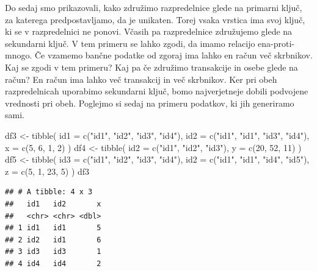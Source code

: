 \documentclass[
]{book}
\newenvironment{Shaded}{\begin{snugshade}}{\end{snugshade}}
\newcommand{\AttributeTok}[1]{\textcolor[rgb]{0.77,0.63,0.00}{#1}}
\newcommand{\DecValTok}[1]{\textcolor[rgb]{0.00,0.00,0.81}{#1}}
\newcommand{\FunctionTok}[1]{\textcolor[rgb]{0.00,0.00,0.00}{#1}}
\newcommand{\NormalTok}[1]{#1}
\newcommand{\OtherTok}[1]{\textcolor[rgb]{0.56,0.35,0.01}{#1}}
\newcommand{\StringTok}[1]{\textcolor[rgb]{0.31,0.60,0.02}{#1}}
\begin{document}
Do sedaj smo prikazovali, kako združimo razpredelnice glede na primarni ključ, za katerega predpostavljamo, da je unikaten. Torej vsaka vrstica ima svoj ključ, ki se v razpredelnici ne ponovi. Včasih pa razpredelnice združujemo glede na sekundarni ključ. V tem primeru se lahko zgodi, da imamo relacijo ena-proti-mnogo. Če vzamemo bančne podatke od zgoraj ima lahko en račun več skrbnikov. Kaj se zgodi v tem primeru? Kaj pa če združimo transakcije in osebe glede na račun? En račun ima lahko več transakcij in več skrbnikov. Ker pri obeh razpredelnicah uporabimo sekundarni ključ, bomo najverjetneje dobili podvojene vrednosti pri obeh. Poglejmo si sedaj na primeru podatkov, ki jih generiramo sami.

\begin{Shaded}
\begin{Highlighting}[]
\NormalTok{df3 }\OtherTok{\textless{}{-}} \FunctionTok{tibble}\NormalTok{(}
  \AttributeTok{id1 =} \FunctionTok{c}\NormalTok{(}\StringTok{"id1"}\NormalTok{, }\StringTok{"id2"}\NormalTok{, }\StringTok{"id3"}\NormalTok{, }\StringTok{"id4"}\NormalTok{),}
  \AttributeTok{id2 =} \FunctionTok{c}\NormalTok{(}\StringTok{"id1"}\NormalTok{, }\StringTok{"id1"}\NormalTok{, }\StringTok{"id3"}\NormalTok{, }\StringTok{"id4"}\NormalTok{),}
  \AttributeTok{x =} \FunctionTok{c}\NormalTok{(}\DecValTok{5}\NormalTok{, }\DecValTok{6}\NormalTok{, }\DecValTok{1}\NormalTok{, }\DecValTok{2}\NormalTok{)}
\NormalTok{)}
\NormalTok{df4 }\OtherTok{\textless{}{-}} \FunctionTok{tibble}\NormalTok{(}
  \AttributeTok{id2 =} \FunctionTok{c}\NormalTok{(}\StringTok{"id1"}\NormalTok{, }\StringTok{"id2"}\NormalTok{, }\StringTok{"id3"}\NormalTok{),}
  \AttributeTok{y =} \FunctionTok{c}\NormalTok{(}\DecValTok{20}\NormalTok{, }\DecValTok{52}\NormalTok{, }\DecValTok{11}\NormalTok{)}
\NormalTok{)}
\NormalTok{df5 }\OtherTok{\textless{}{-}} \FunctionTok{tibble}\NormalTok{(}
  \AttributeTok{id3 =} \FunctionTok{c}\NormalTok{(}\StringTok{"id1"}\NormalTok{, }\StringTok{"id2"}\NormalTok{, }\StringTok{"id3"}\NormalTok{, }\StringTok{"id4"}\NormalTok{),}
  \AttributeTok{id2 =} \FunctionTok{c}\NormalTok{(}\StringTok{"id1"}\NormalTok{, }\StringTok{"id1"}\NormalTok{, }\StringTok{"id4"}\NormalTok{, }\StringTok{"id5"}\NormalTok{),}
  \AttributeTok{z =} \FunctionTok{c}\NormalTok{(}\DecValTok{5}\NormalTok{, }\DecValTok{1}\NormalTok{, }\DecValTok{23}\NormalTok{, }\DecValTok{5}\NormalTok{)}
\NormalTok{)}
\NormalTok{df3}
\end{Highlighting}
\end{Shaded}

\begin{verbatim}
## # A tibble: 4 x 3
##   id1   id2       x
##   <chr> <chr> <dbl>
## 1 id1   id1       5
## 2 id2   id1       6
## 3 id3   id3       1
## 4 id4   id4       2
\end{verbatim}
\end{document}

